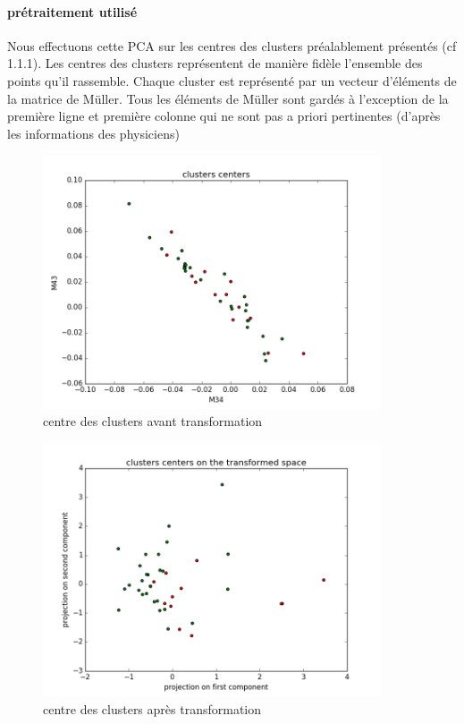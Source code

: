 \documentclass[a4paper,10pt]{report}
\begin{document}
\paragraph{prétraitement utilisé}
Nous effectuons cette PCA sur les centres des clusters préalablement présentés (cf 1.1.1). Les centres des clusters représentent de manière fidèle l'ensemble des points qu'il rassemble. Chaque cluster est représenté par un vecteur d'éléments de la matrice de Müller. Tous les éléments de Müller sont gardés à l’exception de la première ligne et première colonne qui ne sont pas a priori pertinentes (d'après les informations des physiciens)
\begin{figure}
  \caption{centre des clusters avant transformation}
  \centering
  \includegraphics[width=10cm]{PCA_0.png}
\end{figure}
\begin{figure}
  \caption{centre des clusters après transformation}
  \centering
  \includegraphics[width=10cm]{PCA_1.png}
\end{figure}
\end{document}
